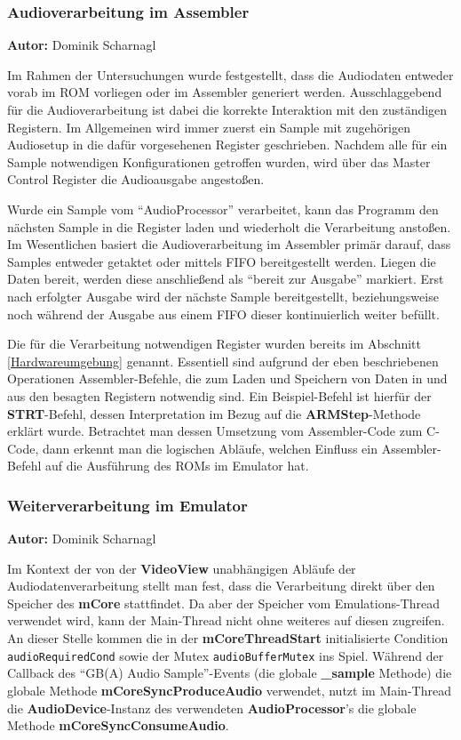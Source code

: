 \documentclass[11pt,a4paper]{scrartcl}
\newcommand{\AutorDominik} {
    \vspace{-4mm}
    \large \textbf{Autor:} Dominik Scharnagl \normalsize
    \vspace{2mm}
}
\begin{document}

\subsubsection{Audioverarbeitung im Assembler}
\AutorDominik

Im Rahmen der Untersuchungen wurde festgestellt, dass die Audiodaten entweder vorab im ROM vorliegen oder im Assembler generiert werden. Ausschlaggebend f\"ur die Audioverarbeitung ist dabei die korrekte Interaktion mit den zust\"andigen Registern. Im Allgemeinen wird immer zuerst ein Sample mit zugeh\"origen Audiosetup in die daf\"ur vorgesehenen Register geschrieben. Nachdem alle f\"ur ein Sample notwendigen Konfigurationen getroffen wurden, wird \"uber das Master Control Register die Audioausgabe angesto{\ss}en.

Wurde ein Sample vom \enquote{AudioProcessor} verarbeitet, kann das Programm den n\"achsten Sample in die Register laden und wiederholt die Verarbeitung ansto{\ss}en. Im Wesentlichen basiert die Audioverarbeitung im Assembler prim\"ar darauf, dass Samples entweder getaktet oder mittels FIFO bereitgestellt werden. Liegen die Daten bereit, werden diese anschlie{\ss}end als \enquote{bereit zur Ausgabe} markiert. Erst nach erfolgter Ausgabe wird der n\"achste Sample bereitgestellt, beziehungsweise noch w\"ahrend der Ausgabe aus einem FIFO dieser kontinuierlich weiter bef\"ullt.

Die f\"ur die Verarbeitung notwendigen Register wurden bereits im Abschnitt \ref{Hardwareumgebung} genannt. Essentiell sind aufgrund der eben beschriebenen Operationen Assembler-Befehle, die zum Laden und Speichern von Daten in und aus den besagten Registern notwendig sind. Ein Beispiel-Befehl ist hierf\"ur der \textbf{STRT}-Befehl, dessen Interpretation im Bezug auf die \textbf{ARMStep}-Methode erkl\"art wurde. Betrachtet man dessen Umsetzung vom Assembler-Code zum C-Code, dann erkennt man die logischen Abl\"aufe, welchen Einfluss ein Assembler-Befehl auf die Ausf\"uhrung des ROMs im Emulator hat.



\subsubsection{Weiterverarbeitung im Emulator}
\AutorDominik

Im Kontext der von der \textbf{VideoView} unabh\"angigen Abl\"aufe der Audiodatenverarbeitung stellt man fest, dass die Verarbeitung direkt \"uber den Speicher des \textbf{mCore} stattfindet. Da aber der Speicher vom Emulations-Thread verwendet wird, kann der Main-Thread nicht ohne weiteres auf diesen zugreifen. An dieser Stelle kommen die in der \textbf{mCoreThreadStart} initialisierte Condition \verb|audioRequiredCond| sowie der Mutex \verb|audioBufferMutex| ins Spiel. W\"ahrend der Callback des \enquote{GB(A) Audio Sample}-Events (die globale \textbf{{\_}sample} Methode) die globale Methode \textbf{mCoreSyncProduceAudio} verwendet, nutzt im Main-Thread die \textbf{AudioDevice}-Instanz des verwendeten \textbf{AudioProcessor}'s die globale Methode \textbf{mCoreSyncConsumeAudio}.
\end{document}
